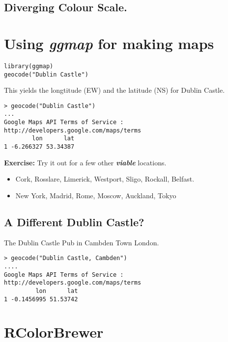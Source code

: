 \documentclass[12pt]{article}
\begin{document}
\subsection*{Diverging Colour Scale.}

\newpage
\section{Using \textit{ggmap} for making maps}

\begin{framed}
\begin{verbatim}
library(ggmap)
geocode("Dublin Castle")
\end{verbatim}
\end{framed}
This yields the longtitude (EW) and the latitude (NS) for Dublin Castle.


\begin{verbatim}
> geocode("Dublin Castle")
...
Google Maps API Terms of Service : http://developers.google.com/maps/terms
        lon      lat
1 -6.266327 53.34387
\end{verbatim}

\textbf{Exercise:} Try it out for a few other \textit{\textbf{viable}} locations.
\begin{itemize}
\item Cork, Rosslare, Limerick, Westport, Sligo, Rockall, Belfast.
\item New York, Madrid, Rome, Moscow, Auckland, Tokyo
\end{itemize}
 
\subsection*{A Different Dublin Castle?}
The Dublin Castle Pub in Cambden Town London.
\begin{verbatim}
> geocode("Dublin Castle, Cambden")
....
Google Maps API Terms of Service : http://developers.google.com/maps/terms
         lon      lat
1 -0.1456995 51.53742 
\end{verbatim}

\newpage
\section{RColorBrewer}
\end{document}
